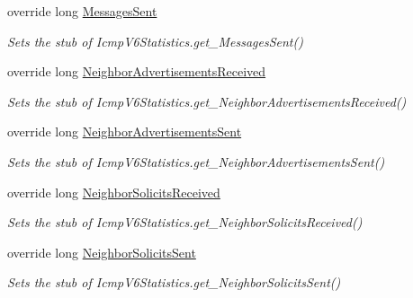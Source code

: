 \begin{DoxyCompactItemize}
override long \hyperlink{class_system_1_1_net_1_1_network_information_1_1_fakes_1_1_stub_icmp_v6_statistics_a5a1be7e776fbdb66a2ee6177e4060455}{Messages\-Sent}
\begin{DoxyCompactList}\small\item\em Sets the stub of Icmp\-V6\-Statistics.\-get\-\_\-\-Messages\-Sent()\end{DoxyCompactList}\item 
override long \hyperlink{class_system_1_1_net_1_1_network_information_1_1_fakes_1_1_stub_icmp_v6_statistics_afc694369ff87e504b171d0c311a155ad}{Neighbor\-Advertisements\-Received}
\begin{DoxyCompactList}\small\item\em Sets the stub of Icmp\-V6\-Statistics.\-get\-\_\-\-Neighbor\-Advertisements\-Received()\end{DoxyCompactList}\item 
override long \hyperlink{class_system_1_1_net_1_1_network_information_1_1_fakes_1_1_stub_icmp_v6_statistics_a6e74406855463ada611eeaa737fdca56}{Neighbor\-Advertisements\-Sent}
\begin{DoxyCompactList}\small\item\em Sets the stub of Icmp\-V6\-Statistics.\-get\-\_\-\-Neighbor\-Advertisements\-Sent()\end{DoxyCompactList}\item 
override long \hyperlink{class_system_1_1_net_1_1_network_information_1_1_fakes_1_1_stub_icmp_v6_statistics_a52b25e5a2e5906a68a410cc522611b2e}{Neighbor\-Solicits\-Received}
\begin{DoxyCompactList}\small\item\em Sets the stub of Icmp\-V6\-Statistics.\-get\-\_\-\-Neighbor\-Solicits\-Received()\end{DoxyCompactList}\item 
override long \hyperlink{class_system_1_1_net_1_1_network_information_1_1_fakes_1_1_stub_icmp_v6_statistics_a5df84eedab31c5aeb2b8fe4d167dafc7}{Neighbor\-Solicits\-Sent}
\begin{DoxyCompactList}\small\item\em Sets the stub of Icmp\-V6\-Statistics.\-get\-\_\-\-Neighbor\-Solicits\-Sent()\end{DoxyCompactList}\item 

\end{DoxyCompactItemize}
